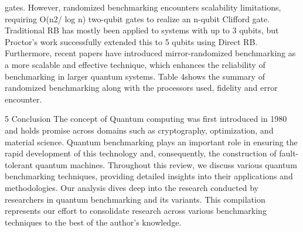 gates. However, randomized benchmarking encounters scalability limitations, requiring O(n2/ log n) two-qubit gates to realize an n-qubit Clifford gate. Traditional RB has mostly been applied to systems with up to 3 qubits, but Proctor’s work successfully extended this to 5 qubits using Direct RB. Furthermore, recent papers have introduced mirror-randomized benchmarking as a more scalable and effective technique, which enhances the reliability of benchmarking in larger quantum systems. Table 4shows the summary of randomized benchmarking along with the processors used, fidelity and error encounter.

5 Conclusion The concept of Quantum computing was first introduced in 1980 and holds promise across domains such as cryptography, optimization, and material science. Quantum benchmarking plays an important role in ensuring the rapid development of this technology and, consequently, the construction of fault-tolerant quantum machines. Throughout this review, we discuss various quantum benchmarking techniques, providing detailed insights into their applications and methodologies. Our analysis dives deep into the research conducted by researchers in quantum benchmarking and its variants. This compilation represents our effort to consolidate research across various benchmarking techniques to the best of the author’s knowledge.

